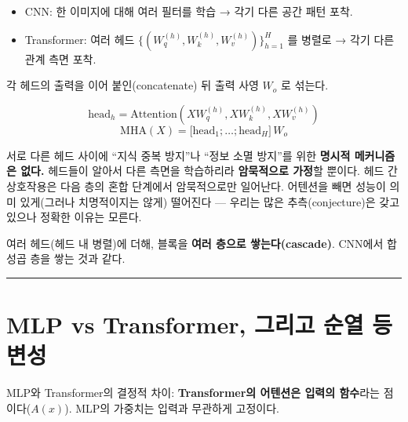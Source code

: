 \documentclass[
  korean,
]{article}
\providecommand{\tightlist}{%
  \setlength{\itemsep}{0pt}\setlength{\parskip}{0pt}}
\begin{document}
\begin{itemize}
\tightlist
\item
  CNN: 한 이미지에 대해 여러 필터를 학습 → 각기 다른 공간 패턴 포착.
\item
  Transformer: 여러 헤드
  \(\{(W_q^{(h)}, W_k^{(h)}, W_v^{(h)})\}_{h=1}^{H}\) 를 병렬로 → 각기
  다른 관계 측면 포착.
\end{itemize}

각 헤드의 출력을 이어 붙인(concatenate) 뒤 출력 사영 \(W_o\) 로 섞는다.

\[
\text{head}_h = \text{Attention}(XW_q^{(h)}, XW_k^{(h)}, XW_v^{(h)})
\] \[
\text{MHA}(X) = \big[\text{head}_1; \dots; \text{head}_H\big]\,W_o
\]

\begin{tcolorbox}[enhanced jigsaw, arc=.35mm, bottomrule=.15mm, bottomtitle=1mm, breakable, colback=white, colbacktitle=quarto-callout-warning-color!10!white, colframe=quarto-callout-warning-color-frame, coltitle=black, left=2mm, leftrule=.75mm, opacityback=0, opacitybacktitle=0.6, rightrule=.15mm, title=\textcolor{quarto-callout-warning-color}{\faExclamationTriangle}\hspace{0.5em}{솔직한 한계}, titlerule=0mm, toprule=.15mm, toptitle=1mm]

서로 다른 헤드 사이에 ``지식 중복 방지''나 ``정보 소멸 방지''를 위한
\textbf{명시적 메커니즘은 없다.} 헤드들이 알아서 다른 측면을 학습하리라
\textbf{암묵적으로 가정}할 뿐이다. 헤드 간 상호작용은 다음 층의 혼합
단계에서 암묵적으로만 일어난다. 어텐션을 빼면 성능이 의미 있게(그러나
치명적이지는 않게) 떨어진다 --- 우리는 많은 추측(conjecture)은 갖고
있으나 정확한 이유는 모른다.

\end{tcolorbox}

여러 헤드(헤드 내 병렬)에 더해, 블록을 \textbf{여러 층으로
쌓는다(cascade)}. CNN에서 합성곱 층을 쌓는 것과 같다.

\begin{center}\rule{0.5\linewidth}{0.5pt}\end{center}

\section{MLP vs Transformer, 그리고 순열 등변성}\label{sec-equivariance}

MLP와 Transformer의 결정적 차이: \textbf{Transformer의 어텐션은 입력의
함수}라는 점이다(\(A(x)\)). MLP의 가중치는 입력과 무관하게 고정이다.
\end{document}

